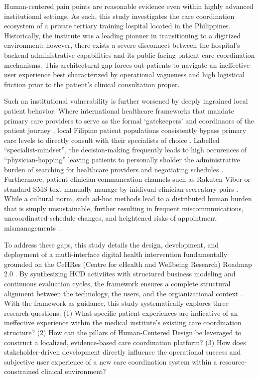 \documentclass[manuscript, screen, review]{acmart}
\begin{document}
Human-centered pain points are reasonable evidence even within highly advanced institutional settings. As such, this study investigates the care coordination ecosystem of a private tertiary training lospital located in the Philippines. Historically, the institute was a leading pionner in transitioning to a digitized environment; however, there exists a severe disconnect between the hospital's backend administrative capabilities and its public-facing patient care coordination mechanisms. This architectural gap forces out-patients to navigate an ineffective user experience best characterized by operational vagueness and high logistical friction prior to the patient's clinical consultation proper. 

Such an institutional vulnerability is further worsened by deeply ingrained local patient behavior. Where international healthcare frameworks that mandate primary care providers to serve as the formal `gatekeepers' and coordinaors of the patient journey \cite{DOH_AO_2020_0024}, local Filipino patient populations consistently bypass primary care levels to directly consult with their specialists of choice \cite{Lajeunesse2012}. Labelled ``specialist-mindset'', the decision-making frequently leads to high occurences of ``physician-hopping'' leaving patients to personally sholder the administrative burden of searching for healthcare providers and negotiating schedules \cite{Lajeunesse2012,Chang682}. Furthermore, patient-clinician communcation channels such as Rakuten Viber or standard SMS text manually manage by inidivual clinician-secreatary pairs \cite{Rodriguez_A}. While a cultural norm, such ad-hoc methods lead to a distributed human burden that is simply unsustainable, further resulting in frequent miscommnuications, uncoordinated schedule changes, and heightened risks of appointment mismanagements \cite{Rodriguez_A,Chang682}. 

To address these gaps, this study details the design, development, and deployment of a mutli-interface digital health intervention fundamentally grounded on the CeHRes (Centre for eHealth and Wellbeing Research) Roadmap 2.0 \cite{Kip2025CeHRes}. By synthesizing HCD activiites with structured business modeling and continuous evaluation cycles, the framework ensures a complete structural alignment between the technology, the users, and the orgianizational context \cite{wentzel_keeping_an_eye,Kip2025CeHRes}. With the framework as guidance, this study systematically explores three research questions: 
(1) What specific patient experiences are indicative of an ineffective experience within the medical institute's existing care coordination structure?
(2) How can the pillars of Human-Centered Design be leveraged to construct a localized, evidence-based care coordination platform?
(3) How does stakeholder-driven development directly influence the operational success and subjective user experience of a new care coordination system within a resource-constrained clinical environment?
\end{document}
